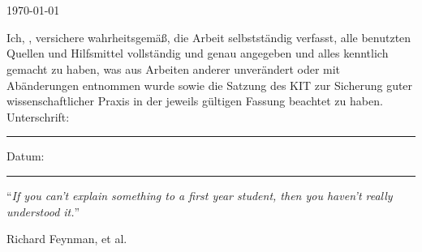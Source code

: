 \documentclass[
11pt, %
ngerman, %
singlespacing, %
headsepline, %
]{MastersDoctoralThesis} %
\begin{document}
\begin{titlepage}
\begin{center}
\vfill


\groupname\\\deptname\\[2cm] %
 
\vfill

{\large \today}\\[4cm] %

 
\vfill
\end{center}
\end{titlepage}


\begin{declaration}
\addchaptertocentry{\authorshipname} %
\noindent Ich, \authorname , versichere wahrheitsgemäß, die Arbeit selbstständig verfasst, alle benutzten Quellen und Hilfsmittel vollständig und genau angegeben und alles kenntlich gemacht zu haben, was aus Arbeiten anderer unverändert oder mit Abänderungen entnommen wurde sowie die Satzung des KIT zur Sicherung guter wissenschaftlicher Praxis in der jeweils gültigen Fassung beachtet zu haben.
 \\[0.5cm]
\noindent Unterschrift:\\
\rule[0.5em]{25em}{0.5pt} %
 
\noindent Datum:\\
\rule[0.5em]{25em}{0.5pt} %
\end{declaration}

\cleardoublepage


\vspace*{0.2\textheight}

\noindent\enquote{\itshape If you can't explain something to a first year student, then you haven't really understood it.}\bigbreak

\hfill Richard Feynman, et al.

\end{document}
